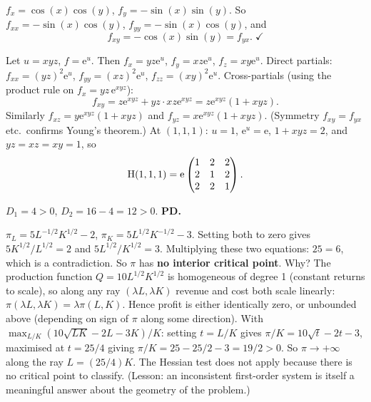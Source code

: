 \begin{solutions}
  \item $f_x = \cos(x)\cos(y)$, $f_y = -\sin(x)\sin(y)$. So
        $f_{xx} = -\sin(x)\cos(y)$, $f_{yy} = -\sin(x)\cos(y)$, and
        \[
          f_{xy} = -\cos(x)\sin(y) = f_{yx} . \; \checkmark
        \]

  \item Let $u=xyz$, $f=\mathrm{e}^{u}$. Then $f_x = yz\mathrm{e}^{u}$,
        $f_y = xz\mathrm{e}^{u}$, $f_z = xy\mathrm{e}^{u}$. Direct
        partials: $f_{xx} = (yz)^{2}\mathrm{e}^{u}$,
        $f_{yy} = (xz)^{2}\mathrm{e}^{u}$, $f_{zz} = (xy)^{2}\mathrm{e}^{u}$.
        Cross-partials (using the product rule on
        $f_x = yz\,\mathrm{e}^{xyz}$):
        \[
          f_{xy} = z\mathrm{e}^{xyz} + yz\cdot xz\mathrm{e}^{xyz}
                 = z\mathrm{e}^{xyz}(1+xyz) .
        \]
        Similarly $f_{xz} = y\mathrm{e}^{xyz}(1+xyz)$ and
        $f_{yz} = x\mathrm{e}^{xyz}(1+xyz)$. (Symmetry $f_{xy}=f_{yx}$
        etc.\ confirms Young's theorem.) At $(1,1,1)$: $u=1$,
        $\mathrm{e}^{u}=\mathrm{e}$, $1+xyz=2$, and $yz=xz=xy=1$, so
        \[
          \operatorname{H}(1,1,1) = \mathrm{e}\begin{pmatrix}1&2&2\\2&1&2\\2&2&1\end{pmatrix} .
        \]

  \item $D_1 = 4 > 0$, $D_2 = 16 - 4 = 12 > 0$. \textbf{PD.}

  \item $\pi_L = 5L^{-1/2}K^{1/2}-2$, $\pi_K = 5L^{1/2}K^{-1/2}-3$.
        Setting both to zero gives $5K^{1/2}/L^{1/2}=2$ and
        $5L^{1/2}/K^{1/2}=3$. Multiplying these two equations: $25=6$,
        which is a contradiction. So $\pi$ has \textbf{no interior
        critical point}. Why? The production function
        $Q=10L^{1/2}K^{1/2}$ is homogeneous of degree 1 (constant returns
        to scale), so along any ray $(\lambda L,\lambda K)$ revenue and
        cost both scale linearly: $\pi(\lambda L,\lambda K)=\lambda\pi(L,K)$.
        Hence profit is either identically zero, or unbounded above
        (depending on sign of $\pi$ along some direction). With
        $\max_{L/K}(10\sqrt{LK}-2L-3K)/K$: setting $t=L/K$ gives
        $\pi/K = 10\sqrt{t}-2t-3$, maximised at $t=25/4$ giving
        $\pi/K = 25-25/2-3 = 19/2 > 0$. So $\pi\to+\infty$ along the ray
        $L=(25/4)K$. The Hessian test does not apply because there is no
        critical point to classify. (Lesson: an inconsistent
        first-order system is itself a meaningful answer about the
        geometry of the problem.)


\end{solutions}
